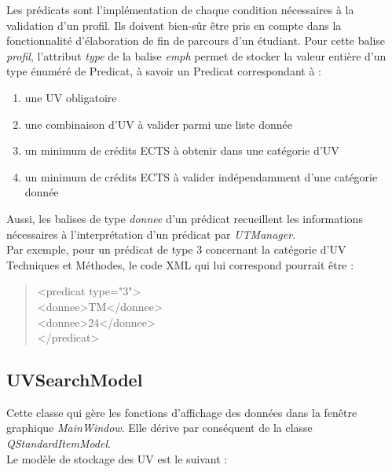 \documentclass[a4paper,10pt,french]{report}
\begin{document}
	Les prédicats sont l'implémentation de chaque condition nécessaires à la validation d'un profil.
	Ils doivent bien-sûr être pris en compte dans la fonctionnalité d'élaboration de fin de parcours d'un étudiant.	
	Pour cette balise \emph{profil}, l'attribut \emph{type} de la balise \emph{emph} permet de stocker la valeur entière d'un type énuméré de Predicat, à savoir un Predicat correspondant à :\\
	\begin{enumerate}
	\item une UV obligatoire
	\item une combinaison d'UV à valider parmi une liste donnée
	\item un minimum de crédits ECTS à obtenir dans une catégorie d'UV
	\item un minimum de crédits ECTS à valider indépendamment d'une catégorie donnée
	\end{enumerate}
	Aussi, les balises de type \emph{donnee} d'un prédicat recueillent les informations nécessaires à l'interprétation d'un prédicat par \emph{UTManager}.\\
	Par exemple, pour un prédicat de type 3 concernant la catégorie d'UV Techniques et Méthodes, le code XML qui lui correspond pourrait être :
	\begin{quote}
<predicat type="3">\\
		\hspace*{1cm}<donnee>TM</donnee>\\
		\hspace*{1cm}<donnee>24</donnee>\\
</predicat>\\
	\end{quote}
	
	
	
	\subsection{UVSearchModel}\label{subsec:UVSearchModel}
	
	Cette classe qui gère les fonctions d'affichage des données dans la fenêtre graphique \emph{MainWindow}.
    Elle dérive par conséquent de la classe \emph{QStandardItemModel}.\\
	Le modèle de stockage des UV est le suivant :\\
	
\end{document}
